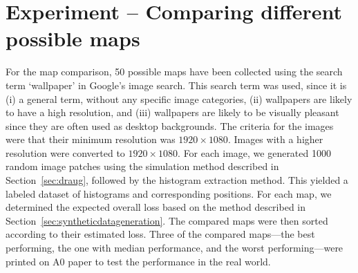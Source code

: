 \section{Experiment -- Comparing different possible maps}

For the map comparison, 50 possible maps have been collected using the
search term `wallpaper' in Google's image search. This search term was
used, since it is (i) a general term, without any specific image
categories, (ii) wallpapers are likely to have a high resolution, and
(iii) wallpapers are likely to be visually pleasant since they
are often used as desktop backgrounds. The criteria for the images were that
their minimum resolution was $1920 \times 1080$. Images with a higher
resolution were converted to $1920 \times 1080$.  For each image, we
generated 1000 random image patches using the simulation method
described in Section~\ref{sec:draug}, followed by the histogram
extraction method. This yielded a labeled dataset of histograms and
corresponding positions. For each map, we determined the expected
overall loss based on the method described in
Section~\ref{sec:syntheticdatageneration}. The compared maps were then sorted
according to their estimated loss. Three of the compared maps---the
best performing, the one with median performance, and the worst
performing---were printed on A0 paper to test the performance in the
real world.

